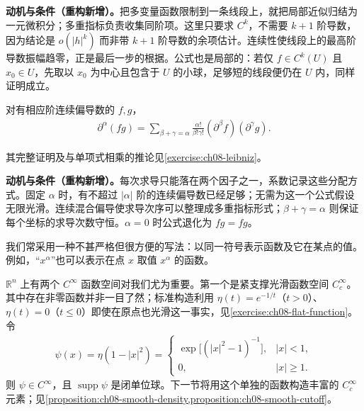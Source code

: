 \documentclass[../../main.tex]{subfiles}
\begin{document}
\begin{remark}
\textbf{动机与条件（重构新增）。}把多变量函数限制到一条线段上，就把局部近似归结为一元微积分；多重指标负责收集同阶项。这里只要求 $C^k$，不需要 $k+1$ 阶导数，因为结论是 $o(|h|^k)$ 而非带 $k+1$ 阶导数的余项估计。连续性使线段上的最高阶导数振幅趋零，正是最后一步的根据。公式也是局部的：若仅 $f\in C^k(U)$ 且 $x_0\in U$，先取以 $x_0$ 为中心且包含于 $U$ 的小球，足够短的线段便仍在 $U$ 内，同样证明成立。
\end{remark}
\begin{proposition}[偏导数的乘积法则]\label{proposition:ch08-leibniz-formula}
对有相应阶连续偏导数的 $f,g$，
\begin{align*}
\partial^\alpha(fg)=\sum_{\beta+\gamma=\alpha}
\frac{\alpha!}{\beta!\gamma!}(\partial^\beta f)(\partial^\gamma g).
\end{align*}
\end{proposition}
其完整证明及与单项式相乘的推论见\cref{exercise:ch08-leibniz}。
\begin{remark}
\textbf{动机与条件（重构新增）。}每次求导只能落在两个因子之一，系数记录这些分配方式。固定 $\alpha$ 时，有不超过 $|\alpha|$ 阶的连续偏导数已经足够；无需为这一个公式假设无限光滑。连续混合偏导使求导次序可以整理成多重指标形式；$\beta+\gamma=\alpha$ 则保证每个坐标的求导次数守恒。$\alpha=0$ 时公式退化为 $fg=fg$。
\end{remark}
我们常采用一种不甚严格但很方便的写法：以同一符号表示函数及它在某点的值。例如，“$x^\alpha$”也可以表示在点 $x$ 取值 $x^\alpha$ 的函数。
\begin{example}[非零光滑紧支撑函数]\label{example:ch08-bump-function}
$\mathbb R^n$ 上有两个 $C^\infty$ 函数空间对我们尤为重要。第一个是紧支撑光滑函数空间 $C_c^\infty$。其中存在非零函数并非一目了然；标准构造利用
$\eta(t)=e^{-1/t}$（$t>0$）、$\eta(t)=0$（$t\leqslant0$）即使在原点也光滑这一事实，见\cref{exercise:ch08-flat-function}。令
\begin{align}\label{eq:ch08-bump-function}
\psi(x)=\eta(1-|x|^2)=
\begin{cases}
\exp\bigl[(|x|^2-1)^{-1}\bigr],&|x|<1,\\
0,&|x|\geqslant1.
\end{cases}
\end{align}
则 $\psi\in C^\infty$，且 $\operatorname{supp}\psi$ 是闭单位球。下一节将用这个单独的函数构造丰富的 $C_c^\infty$ 元素；见\cref{proposition:ch08-smooth-density,proposition:ch08-smooth-cutoff}。
\end{example}
\end{document}
